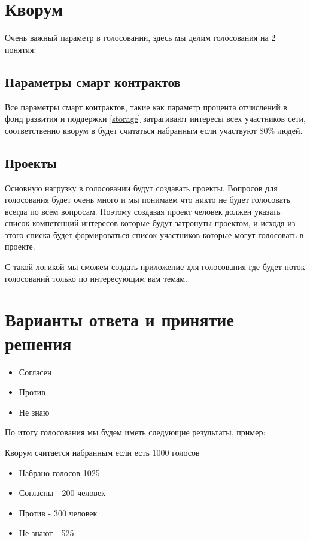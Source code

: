 \documentclass[a4paper,12pt]{report}
\begin{document}
\section{Кворум}
	
Очень важный параметр в голосовании, здесь мы делим голосования на 2 понятия:

\subsection{Параметры смарт контрактов}
Все параметры смарт контрактов, такие как параметр процента отчислений в фонд развития и поддержки \ref{storage} затрагивают интересы всех участников сети, соответственно кворум в будет считаться набранным если участвуют 80\% людей. 

\subsection{Проекты}
Основную нагрузку в голосовании будут создавать проекты. Вопросов для голосования будет очень много и мы понимаем что никто не будет голосовать всегда по всем вопросам. Поэтому создавая проект человек должен указать список компетенций-интересов которые будут затронуты проектом, и исходя из этого списка будет формироваться список участников которые могут голосовать в проекте. 

С такой логикой мы сможем создать приложение для голосования где будет поток голосований только по интересующим вам темам. 

\section{Варианты ответа и принятие решения}

\begin{itemize}
	\item Согласен
	\item Против
	\item Не знаю
\end{itemize}

По итогу голосования мы будем иметь следующие результаты,  пример:\par

Кворум считается набранным если есть 1000 голосов

\begin{itemize}
	\item Набрано голосов 1025
	\item Согласны - 200 человек
	\item Против - 300 человек
	\item Не знают - 525
\end{itemize}
\end{document}
